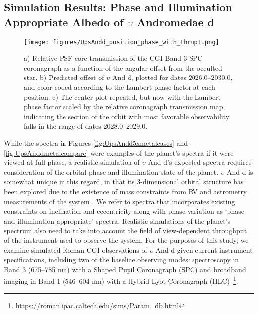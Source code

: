\documentclass[12pt, letterpaper]{aastex631}
\begin{document}
\subsection{Simulation Results: Phase and Illumination Appropriate Albedo of $\upsilon$ Andromedae d} \label{subsec:geoalbedo}

 \begin{figure*}[t]
  \centering
  \texttt{[image: figures/UpsAndd\_position\_phase\_with\_thrupt.png]}
  \caption{a) Relative PSF core transmission of the CGI Band 3 SPC coronagraph as a function of the angular offset from the occulted star. b) Predicted offset of $\upsilon$ And d, plotted for dates 2026.0--2030.0, and color-coded according to the Lambert phase factor at each position. c) The center plot repeated, but now with the Lambert phase factor scaled by the relative coronagraph transmission map, indicating the section of the orbit with most favorable observability falls in the range of dates 2028.0--2029.0.}
  \label{fig:UpsAnddEphemeris}
\end{figure*}

While the spectra in Figures \ref{fig:UpsAndd5xmetalcases} and \ref{fig:UpsAnddmetalcompare} were examples of the planet's spectra if it were viewed at full phase, a realistic simulation of $\upsilon$ And d's expected spectra requires consideration of the orbital phase and illumination state of the planet.  $\upsilon$ And d is somewhat unique in this regard, in that its 3-dimensional orbital structure has been explored due to the existence of mass constraints from RV and astrometry measurements of the system \citep{2010ApJ...715.1203M, 2015ApJ...798...46D}. We refer to spectra that incorporates existing constraints on inclination and eccentricity along with phase variation as `phase and illumination appropriate' spectra. Realistic simulations of the planet's spectrum also need to take into account the field of view-dependent throughput \citep{10.1117/12.2562997} of the instrument used to observe the system.  For the purposes of this study, we examine simulated Roman CGI observations of $\upsilon$ And d given current instrument specifications, including two of the baseline observing modes: spectroscopy in Band 3 (675--785 nm) with a Shaped Pupil Coronagraph (SPC) and broadband imaging in Band 1 (546--604 nm) with a Hybrid Lyot Coronagraph (HLC)~\citep{Mennesson2020arXiv}\footnote{\url{https://roman.ipac.caltech.edu/sims/Param_db.html}}.   
\end{document}
